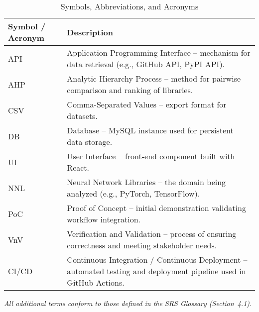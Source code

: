 \documentclass[12pt, titlepage]{article}
\begin{document}


\begin{table}[H]
\centering
\caption{Symbols, Abbreviations, and Acronyms}
\setlength{\tabcolsep}{5pt}
\renewcommand{\arraystretch}{1.2}
\footnotesize

\begin{tabularx}{\textwidth}{l X}
\toprule
\textbf{Symbol / Acronym} & \textbf{Description} \\
\midrule
\arrayrulecolor[gray]{0.8}
API & Application Programming Interface – mechanism for data retrieval (e.g., GitHub API, PyPI API). \\
\hline
AHP & Analytic Hierarchy Process – method for pairwise comparison and ranking of libraries. \\
\hline
CSV & Comma-Separated Values – export format for datasets. \\
\hline
DB & Database – MySQL instance used for persistent data storage. \\
\hline
UI & User Interface – front-end component built with React. \\
\hline
NNL & Neural Network Libraries – the domain being analyzed (e.g., PyTorch, TensorFlow). \\
\hline
PoC & Proof of Concept – initial demonstration validating workflow integration. \\
\hline
VnV & Verification and Validation – process of ensuring correctness and meeting stakeholder needs. \\
\hline
CI/CD & Continuous Integration / Continuous Deployment – automated testing and deployment pipeline used in GitHub Actions. \\
\bottomrule
\end{tabularx}
\end{table}

\noindent\textit{All additional terms conform to those defined in the SRS Glossary (Section~4.1).}
\newpage

\end{document}
